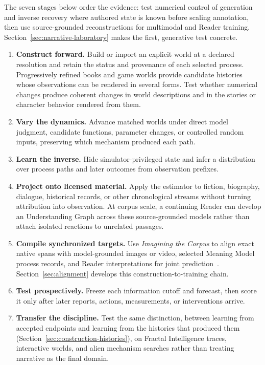 \documentclass[10pt]{article}
\begin{document}
The seven stages below order the evidence: test numerical control of generation
and inverse recovery where authored state is known before scaling annotation,
then use source-grounded reconstructions for multimodal and Reader training.
Section~\ref{sec:narrative-laboratory} makes the first, generative test concrete.

\begin{enumerate}
  \item \textbf{Construct forward.} Build or import an explicit world at a
    declared resolution and retain the status and provenance of each selected
    process. Progressively refined books and game worlds provide candidate
    histories whose observations can be rendered in several forms. Test whether
    numerical changes produce coherent changes in world descriptions and in
    the stories or character behavior rendered from them.
  \item \textbf{Vary the dynamics.} Advance matched worlds under direct model
    judgment, candidate functions, parameter changes, or controlled random
    inputs, preserving which mechanism produced each path.
  \item \textbf{Learn the inverse.} Hide simulator-privileged state and infer a
    distribution over process paths and later outcomes from observation
    prefixes.
  \item \textbf{Project onto licensed material.} Apply the estimator to fiction,
    biography, dialogue, historical records, or other chronological streams
    without turning attribution into observation. At corpus scale, a continuing
    Reader can develop an Understanding Graph across these source-grounded
    models rather than attach isolated reactions to unrelated passages.
  \item \textbf{Compile synchronized targets.} Use \emph{Imagining the Corpus}
    to align exact native spans with model-grounded images or video, selected
    Meaning Model process records, and Reader interpretations for joint
    prediction~\cite{westerbergImagining2026}. Section~\ref{sec:alignment}
    develops this construction-to-training chain.
  \item \textbf{Test prospectively.} Freeze each information cutoff and forecast,
    then score it only after later reports, actions, measurements, or
    interventions arrive.
  \item \textbf{Transfer the discipline.} Test the same distinction, between learning from accepted
    endpoints and learning from the histories that produced them
    (Section~\ref{sec:construction-histories}), on Fractal Intelligence traces, interactive worlds, and alien
    mechanism searches rather than treating narrative as the final domain.
\end{enumerate}
\end{document}
